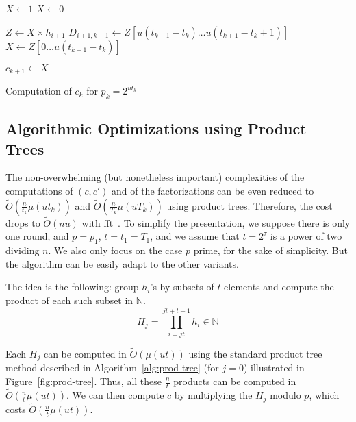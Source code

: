 \documentclass[11pt]{llncs}
\newcommand{\Oapp}{\ensuremath{\tilde{O}}}
\begin{document}
\begin{algorithm}
\newcommand{\vstart}{\ensuremath{\mathrm{start}}}
\newcommand{\vmid}{\ensuremath{\mathrm{mid}}}
\newcommand{\vend}{\ensuremath{\mathrm{end}}}
\begin{algorithmic}[1]

  \State $X \gets 1$
\Else
  \State $X \gets 0$
\EndIf

  \State $Z \gets X \times h_{i+1}$
  \State $D_{i+1,k+1} \gets Z[u(t_{k+1}-t_k)\dots u(t_{k+1}-t_k+1)]$
  \State $X \gets Z[0\dots u(t_{k+1}-t_k)]$
\EndFor

\State $c_{k+1} \gets X$
\end{algorithmic}
\caption{Computation of $c_k$ for $p_k = 2^{ut_k}$}\label{alg:even-p-c}
\end{algorithm}

\subsection{Algorithmic Optimizations using Product Trees}
\label{sec:algo-opt-prod-trees}

The non-overwhelming (but nonetheless important) complexities of the computations of $(c,c')$ and of the factorizations can be even reduced to $\Oapp(\frac{n}{t_k} \mu(u t_k))$ and $\Oapp(\frac{n}{T_k} \mu(u T_k))$ using product trees. 
Therefore, the cost drops to $\Oapp(n u)$ with {\sc fft}~\cite{schonhage1971schnelle}. 
To simplify the presentation, we suppose there is only one round, and $p=p_1$, $t=t_1=T_1$, and we assume that $t=2^\tau$ is a power of two dividing $n$.
We also only focus on the case $p$ prime, for the sake of simplicity.
But the algorithm can be easily adapt to the other variants.

The idea is the following: group $h_i$'s by subsets of $t$ elements and compute the product of each such subset in $\mathbb{N}$.
\[ H_j = \prod_{i=j t}^{j t + t - 1} h_i\in\mathbb{N} \]

Each $H_j$ can be computed in $\Oapp(\mu(u t))$ using the standard product tree method described in Algorithm~\ref{alg:prod-tree} (for $j=0$) illustrated in Figure~\ref{fig:prod-tree}.
Thus, all these $\frac{n}{t}$ products can be computed in $\Oapp(\frac{n}{t} \mu(u t))$. We can then compute $c$ by multiplying the $H_j$ modulo $p$, which costs $\Oapp(\frac{n}{t} \mu(u t))$.\smallskip
\end{document}
